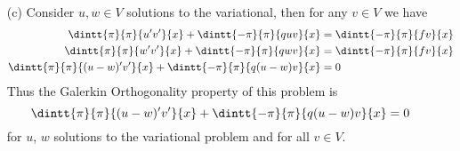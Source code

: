 \documentclass[11pt, oneside]{article}
\begin{document}
\begin{enumerate}
\begin{enumerate}
\begin{proof}
        Now let $u$ be a solution to the energy minimization problem, then 
        \[
          F(u) \le F(w)
        \]
        for all $w \in V$.
        Let $v \in V$ and consider $w = u + \varepsilon v$, then
        $F(u) \le F(u + \varepsilon v)$.
        Consider the function of $\varepsilon$,
        \[
          g(\varepsilon) = F(u + \varepsilon v)
        \]
        we know that $g$ has a minimum at $\varepsilon = 0$ thus $g'(0) = 0$.
        \begin{align*}
          g(\varepsilon) &= \frac{1}{2}\p{\dintt{\pi}{\pi}{(u'+\varepsilon v')^2}{x} + \dintt{-\pi}{\pi}{q(u+\varepsilon v)^2}{x}} - \dintt{-\pi}{\pi}{f(u+\varepsilon v)}{x} \\
          g'(\varepsilon) &= \dintt{-\pi}{\pi}{u'v'}{x} + \dintt{-\pi}{\pi}{quv}{x} - \dintt{-\pi}{\pi}{fv}{x} + 2\varepsilon\dintt{-\pi}{\pi}{(v')^2 + qv^2}{x} \\
          g'(0) &= \dintt{-\pi}{\pi}{u'v'}{x} + \dintt{-\pi}{\pi}{quv}{x} - \dintt{-\pi}{\pi}{fv}{x} \\
          0 &= \dintt{-\pi}{\pi}{u'v'}{x} + \dintt{-\pi}{\pi}{quv}{x} - \dintt{-\pi}{\pi}{fv}{x} \\
          \dintt{-\pi}{\pi}{fv}{x} &= \dintt{-\pi}{\pi}{u'v'}{x} + \dintt{-\pi}{\pi}{quv}{x} \\
        \end{align*}
        Since this is true for any $v \in V$, this shows that $u$ is a solution
        to the variational problem.
      \end{proof}

    \item[(c)] %
      Consider $u, w \in V$ solutions to the variational, then for any $v \in V$
      we have
      \begin{align*}
        \dintt{\pi}{\pi}{u'v'}{x} + \dintt{-\pi}{\pi}{quv}{x} &= \dintt{-\pi}{\pi}{fv}{x} \\
        \dintt{\pi}{\pi}{w'v'}{x} + \dintt{-\pi}{\pi}{qwv}{x} &= \dintt{-\pi}{\pi}{fv}{x} \\
        \dintt{\pi}{\pi}{(u - w)'v'}{x} + \dintt{-\pi}{\pi}{q(u - w)v}{x} &= 0
      \end{align*}
      Thus the Galerkin Orthogonality property of this problem is
      \[
        \dintt{\pi}{\pi}{(u - w)'v'}{x} + \dintt{-\pi}{\pi}{q(u - w)v}{x} = 0
      \]
      for $u$, $w$ solutions to the variational problem and for all $v \in V$.


\end{enumerate}
\end{enumerate}
\end{document}
